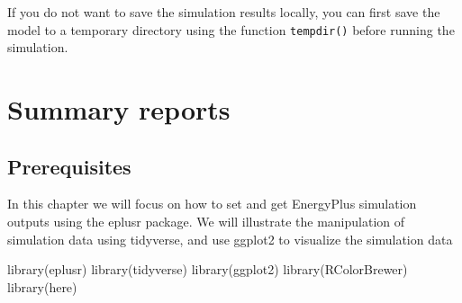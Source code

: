 \documentclass[
]{book}
\newenvironment{Shaded}{\begin{snugshade}}{\end{snugshade}}
\newcommand{\DocumentationTok}[1]{\textcolor[rgb]{0.56,0.35,0.01}{\textbf{\textit{#1}}}}
\newcommand{\FunctionTok}[1]{\textcolor[rgb]{0.00,0.00,0.00}{#1}}
\newcommand{\NormalTok}[1]{#1}
\newcommand{\OtherTok}[1]{\textcolor[rgb]{0.56,0.35,0.01}{#1}}
\newcommand{\SpecialCharTok}[1]{\textcolor[rgb]{0.00,0.00,0.00}{#1}}
\newcommand{\StringTok}[1]{\textcolor[rgb]{0.31,0.60,0.02}{#1}}
\begin{document}
If you do not want to save the simulation results locally, you can first save the model to a temporary directory using the function \texttt{tempdir()} before running the simulation.

\begin{Shaded}
\end{Shaded}

\hypertarget{summary}{%
\chapter{Summary reports}\label{summary}}

\hypertarget{prerequisites-8}{%
\section{Prerequisites}\label{prerequisites-8}}

In this chapter we will focus on how to set and get EnergyPlus simulation outputs using the eplusr package. We will illustrate the manipulation of simulation data using tidyverse, and use ggplot2 to visualize the simulation data

\begin{Shaded}
\begin{Highlighting}[]
\FunctionTok{library}\NormalTok{(eplusr)}
\FunctionTok{library}\NormalTok{(tidyverse)}
\FunctionTok{library}\NormalTok{(ggplot2)}
\FunctionTok{library}\NormalTok{(RColorBrewer)}
\FunctionTok{library}\NormalTok{(here)}
\end{Highlighting}
\end{Shaded}
\end{document}
